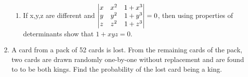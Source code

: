 \documentclass[journal,12pt,twocolumn]{IEEEtran}
\renewcommand\thesection{\arabic{section}}
\begin{document}
\begin{enumerate}[label=\thesection.\arabic*.,ref=\thesection.\theenumi]
\begin{enumerate}
\item If x,y,z are different and $\begin{vmatrix}x & x^2 & 1+x^3 \\ y & y^2 & 1+y^3 \\ z & z^2 & 1+z^3\end{vmatrix}=0 $, then using properties of determinants show that $1+xyz=0.$
\end{enumerate} 

\item A card from a pack of 52 cards is lost. From the remaining cards of the pack, two cards are drawn randomly one-by-one without replacement and are found to to be both kings. Find the probability of the lost card being a king.\\

\end{enumerate}
\end{document}
